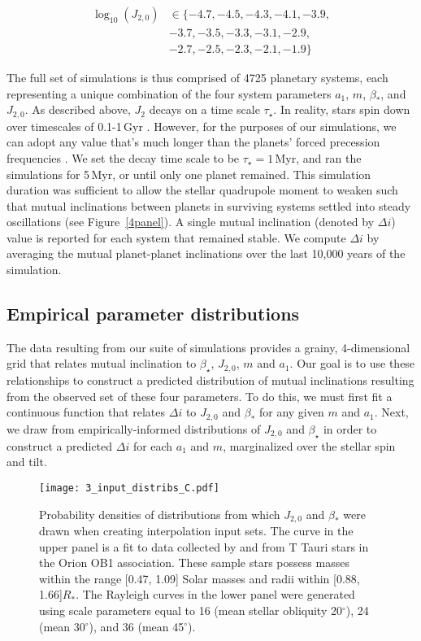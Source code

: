 \documentclass[twocolumn]{aastex63}
\begin{document}
 
 \begin{align}
\log_{10}(J_{2,0})&\in\{-4.7, -4.5, -4.3, -4.1, -3.9,\nonumber\\
&-3.7, -3.5,-3.3, -3.1,-2.9,\nonumber\\
& -2.7,-2.5,-2.3, -2.1,-1.9\} 
\end{align} 


The full set of simulations is thus comprised of 4725 planetary systems, each representing a unique combination of the four system parameters \(a_1\), \(m\), \(\beta_*\), and \(J_{2,0}\).
As described above, $J_2$ decays on a time scale $\tau_\star$. In reality, stars spin down over timescales of 0.1-1\,Gyr \citep{bouvier2014angular}. However, for the purposes of our simulations, we can adopt any value that's much longer than the planets’ forced precession frequencies \citep{henrard1982adiabatic,morbidelli2002modern}. We set the decay time scale to be $\tau_\star=1\,$Myr, and ran the simulations for 5\,Myr, or until only one planet remained. This simulation duration was sufficient to allow the stellar quadrupole moment to weaken such that mutual inclinations between planets in surviving systems settled into steady oscillations (see Figure~\ref{4panel}). A single mutual inclination (denoted by \(\Delta i\)) value is reported for each system that remained stable. We compute $\Delta i$ by averaging the mutual planet-planet inclinations over the last 10,000 years of the simulation.

\subsection{Empirical parameter distributions}


The data resulting from our suite of simulations provides a grainy, 4-dimensional grid that relates mutual inclination to $\beta_\star$, $J_{2,0}$, $m$ and $a_1$. Our goal is to use these relationships to construct a predicted distribution of mutual inclinations resulting from the observed set of these four parameters. To do this, we must first fit a continuous function that relates $\Delta i$ to \(J_{2,0}\) and \(\beta_*\) for any given $m$ and $a_1$. Next, we draw from empirically-informed distributions of $J_{2,0}$ and $\beta_\star$ in order to construct a predicted $\Delta i$ for each $a_1$ and $m$, marginalized over the stellar spin and tilt. 


\begin{figure}
\centering
\texttt{[image: 3\_input\_distribs\_C.pdf]}
\caption{Probability densities of distributions from which \(J_{2,0}\) and \(\beta_*\) were drawn when creating interpolation input sets. The curve in the upper panel is a fit to data collected by \cite{2016AJ....152..198K} and \cite{2005AJ....129..907B} from T Tauri stars in the Orion OB1 association. These sample stars possess masses within the range [0.47, 1.09] Solar masses and radii within [0.88, 1.66]\(R_*\). The Rayleigh curves in the lower panel were generated using scale parameters equal to 16 (mean stellar obliquity 20$^{\circ}$), 24 (mean 30$^{\circ}$), and 36 (mean 45$^{\circ}$).} \label{input_distribs}
\end{figure}
\end{document}
